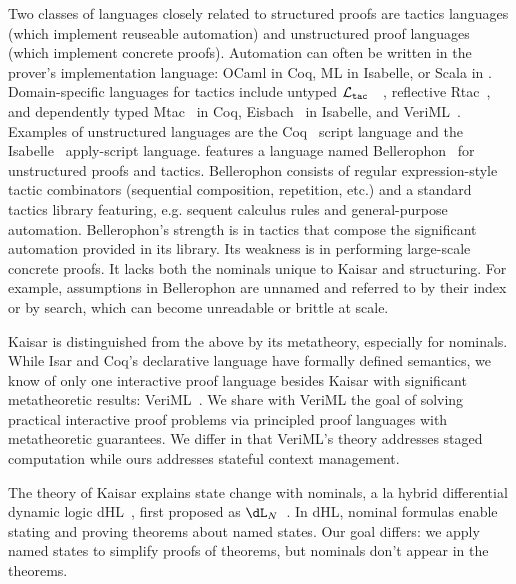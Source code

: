 \documentclass[12pt]{cmuthesis}
\theoremstyle{definition}
\theoremstyle{remark}
\newcommand{\dLN}{\ensuremath{\dL_N}}
\newcommand{\dHL}{\textsf{dHL}\xspace}
\newcommand{\ltac}{\ensuremath{\mathcal{L}_{\tt tac}}~}
\begin{document}
Two classes of languages closely related to structured proofs are tactics languages (which implement reuseable automation) and unstructured proof languages (which implement concrete proofs).
Automation can often be written in the prover's implementation language: OCaml in Coq, ML in Isabelle, or Scala in \KeYmaeraX.
Domain-specific languages for tactics include untyped \ltac~\cite{Delahaye:2000:TLS:1765236.1765246}, reflective Rtac~\cite{malecha2015rtac-coqpl}, and dependently typed Mtac~\cite{Ziliani:2013:MMT:2544174.2500579} in Coq, Eisbach~\cite{Matichuk:2016:EPM:2904234.2904264} in Isabelle, and VeriML~\cite{DBLP:conf/icfp/StampoulisS10,DBLP:conf/popl/StampoulisS12}.
Examples of unstructured languages are the Coq~\cite{COQ} script language and the Isabelle~\cite{Nipkow:2002:IPA:1791547} apply-script language.
\KeYmaeraX features a language named Bellerophon~\cite{DBLP:conf/itp/FultonMBP17} for unstructured proofs and tactics.
Bellerophon consists of regular expression-style tactic combinators (sequential composition, repetition, etc.) and a standard tactics library featuring, e.g. sequent calculus rules and general-purpose automation.
Bellerophon's strength is in tactics that compose the significant automation provided in its library.
Its weakness is in performing large-scale concrete proofs.
It lacks both the nominals unique to Kaisar and structuring.
For example, assumptions in Bellerophon are unnamed and referred to by their index or by search, which can become unreadable or brittle at scale.


Kaisar is distinguished from the above by its metatheory, especially for nominals.
While Isar and Coq's declarative language have formally defined semantics, we know of only one interactive proof language besides Kaisar with significant metatheoretic results:  VeriML~\cite{DBLP:conf/icfp/StampoulisS10,DBLP:conf/popl/StampoulisS12}.
We share with VeriML the goal of solving practical interactive proof problems via principled proof languages with metatheoretic guarantees.
We differ in that VeriML's theory addresses staged computation while ours addresses stateful context management.

The theory of Kaisar explains state change with nominals, a la hybrid differential dynamic logic \dHL~\cite{DBLP:conf/lics/BohrerP18}, first proposed as \dLN~\cite{DBLP:journals/entcs/Platzer07}.
In \dHL, nominal formulas enable stating and proving theorems about named states.
Our goal differs: we apply named states to simplify proofs of theorems, but nominals don't appear in the theorems.
\end{document}
